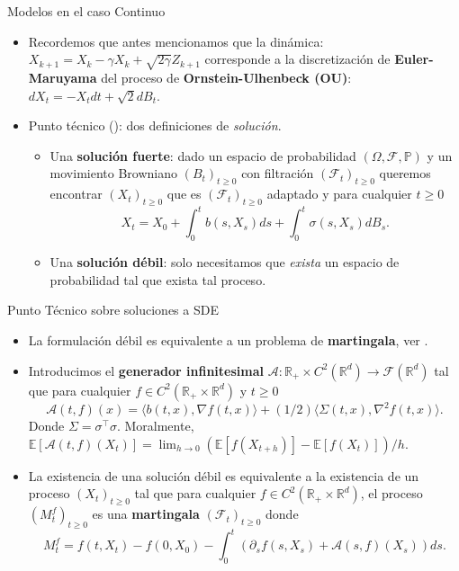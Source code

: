 \documentclass[aspectratio=169,xcolor=dvipsnames, t, spanish]{beamer}
\begin{document}
    
    
    \begin{frame}{Modelos en el caso Continuo}
        \begin{itemize}
            \item Recordemos que antes mencionamos que la dinámica:
            \( X_{k+1}=X_{k}-\gamma X_{k}+\sqrt{2\gamma}Z_{k+1}\) corresponde a la discretización de \textbf{Euler-Maruyama} del proceso de \textbf{Ornstein-Ulhenbeck (OU)}:
            \( dX_{t}=-X_{t}dt+\sqrt{2}dB_{t} . \)
            \pause
            \item Punto técnico (\citet{IkedaWatanabe2014}): dos definiciones de \textit{solución}.
            \begin{itemize}
                \item Una \textbf{solución fuerte}: dado un espacio de probabilidad $(\Omega,\mathcal{F},\mathbb{P})$ y un movimiento Browniano $(B_{t})_{t\ge0}$ con filtración $(\mathcal{F}_{t})_{t\ge0}$ queremos encontrar $(X_{t})_{t\ge0}$ que es $(\mathcal{F}_{t})_{t\ge0}$ adaptado y para cualquier $t\ge0$
                \[ X_{t}=X_{0}+\int_{0}^{t}b(s,X_{s})ds+\int_{0}^{t}\sigma(s,X_{s})dB_{s} . \]
                \item Una \textbf{solución débil}: solo necesitamos que \textit{exista} un espacio de probabilidad tal que exista tal proceso.
            \end{itemize}
        \end{itemize}
    \end{frame}
    
    \begin{frame}{Punto Técnico sobre soluciones a SDE}
        \begin{itemize}
            \item La formulación débil es equivalente a un problema de \textbf{martingala}, ver \citet[Capítulo 6]{StroockVaradhan1997}.
            \item Introducimos el \textbf{generador infinitesimal} $\mathcal{A}: \mathbb{R}_{+} \times C^{2}(\mathbb{R}^{d}) \rightarrow \mathcal{F}(\mathbb{R}^{d})$ tal que para cualquier $f \in C^{2}(\mathbb{R}_{+} \times \mathbb{R}^{d})$ y $t \ge 0$
            \[ \mathcal{A}(t,f)(x) = \langle b(t,x), \nabla f(t,x) \rangle + (1/2)\langle \Sigma(t,x), \nabla^{2}f(t,x) \rangle . \]
            Donde $\Sigma=\sigma^{\top}\sigma$. Moralmente, $\mathbb{E}[\mathcal{A}(t,f)(X_{t})]=\lim_{h\rightarrow0}(\mathbb{E}[f(X_{t+h})]-\mathbb{E}[f(X_{t})])/h.$
            \item La existencia de una solución débil es equivalente a la existencia de un proceso $(X_{t})_{t\ge0}$ tal que para cualquier $f\in C^{2}(\mathbb{R}_{+}\times\mathbb{R}^{d})$, el proceso $(M_{t}^{f})_{t\ge0}$ es una \textbf{martingala} $(\mathcal{F}_{t})_{t\ge0}$ donde
            \[ M_{t}^{f}=f(t,X_{t})-f(0,X_{0})-\int_{0}^{t}(\partial_{s}f(s,X_{s})+\mathcal{A}(s,f)(X_{s}))ds. \]
        \end{itemize}
    \end{frame}
    
\end{document}
